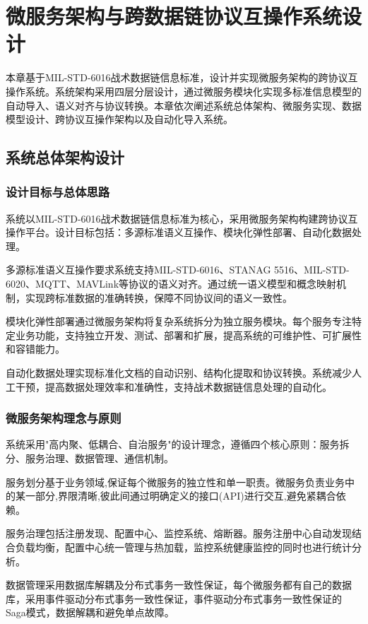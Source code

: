 \chapter{微服务架构与跨数据链协议互操作系统设计}

本章基于MIL-STD-6016战术数据链信息标准，设计并实现微服务架构的跨协议互操作系统。系统架构采用四层分层设计，通过微服务模块化实现多标准信息模型的自动导入、语义对齐与协议转换。本章依次阐述系统总体架构、微服务实现、数据模型设计、跨协议互操作架构以及自动化导入系统。

\section{系统总体架构设计}

\subsection{设计目标与总体思路}

系统以MIL-STD-6016战术数据链信息标准为核心，采用微服务架构构建跨协议互操作平台。设计目标包括：多源标准语义互操作、模块化弹性部署、自动化数据处理。

多源标准语义互操作要求系统支持MIL-STD-6016、STANAG 5516、MIL-STD-6020、MQTT、MAVLink等协议的语义对齐。通过统一语义模型和概念映射机制，实现跨标准数据的准确转换，保障不同协议间的语义一致性。

模块化弹性部署通过微服务架构将复杂系统拆分为独立服务模块。每个服务专注特定业务功能，支持独立开发、测试、部署和扩展，提高系统的可维护性、可扩展性和容错能力。

自动化数据处理实现标准化文档的自动识别、结构化提取和协议转换。系统减少人工干预，提高数据处理效率和准确性，支持战术数据链信息处理的自动化。

\subsection{微服务架构理念与原则}

系统采用"高内聚、低耦合、自治服务"的设计理念，遵循四个核心原则：服务拆分、服务治理、数据管理、通信机制。

服务划分基于业务领域,保证每个微服务的独立性和单一职责。微服务负责业务中的某一部分,界限清晰,彼此间通过明确定义的接口(API)进行交互,避免紧耦合依赖。

服务治理包括注册发现、配置中心、监控系统、熔断器。服务注册中心自动发现结合负载均衡，配置中心统一管理与热加载，监控系统健康监控的同时也进行统计分析。

数据管理采用数据库解耦及分布式事务一致性保证，每个微服务都有自己的数据库，采用事件驱动分布式事务一致性保证，事件驱动分布式事务一致性保证的Saga模式，数据解耦和避免单点故障。


